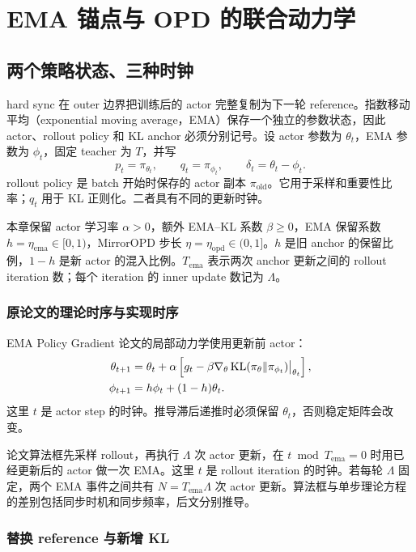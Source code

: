 \chapter{EMA 锚点与 OPD 的联合动力学}
\label{chap:ema}

\section{两个策略状态、三种时钟}

hard sync 在 outer 边界把训练后的 actor 完整复制为下一轮 reference。指数移动平均（exponential moving average，EMA）保存一个独立的参数状态，因此 actor、rollout policy 和 KL anchor 必须分别记号。设 actor 参数为 $\theta_t$，EMA 参数为 $\phi_t$，固定 teacher 为 $T$，并写
\[
 p_t=\pi_{\theta_t},\qquad q_t=\pi_{\phi_t},\qquad
 \delta_t=\theta_t-\phi_t.
\]
rollout policy 是 batch 开始时保存的 actor 副本 $\pi_{\mathrm{old}}$。它用于采样和重要性比率；$q_t$ 用于 KL 正则化。二者具有不同的更新时钟。

本章保留 actor 学习率 $\alpha>0$，额外 EMA--KL 系数 $\beta\ge0$，EMA 保留系数 $h=\eta_{\mathrm{ema}}\in[0,1)$，MirrorOPD 步长 $\eta=\eta_{\mathrm{opd}}\in(0,1]$。$h$ 是旧 anchor 的保留比例，$1-h$ 是新 actor 的混入比例。$T_{\mathrm{ema}}$ 表示两次 anchor 更新之间的 rollout iteration 数；每个 iteration 的 inner update 数记为 $\Lambda$。

\subsection{原论文的理论时序与实现时序}

EMA Policy Gradient 论文的局部动力学使用更新前 actor：\cite{ema2026}
\begin{align}
 \theta_{t+1}&=\theta_t+\alpha\left[g_t-
 \beta\nabla_\theta\operatorname{KL}(\pi_\theta\Vert\pi_{\phi_t})\big|_{\theta_t}\right],
 \label{eq:ema-pre-actor}\\
 \phi_{t+1}&=h\phi_t+(1-h)\theta_t.
 \label{eq:ema-pre-anchor}
\end{align}
这里 $t$ 是 actor step 的时钟。推导滞后递推时必须保留 $\theta_t$，否则稳定矩阵会改变。

论文算法框先采样 rollout，再执行 $\Lambda$ 次 actor 更新，在 $t\bmod T_{\mathrm{ema}}=0$ 时用已经更新后的 actor 做一次 EMA。这里 $t$ 是 rollout iteration 的时钟。若每轮 $\Lambda$ 固定，两个 EMA 事件之间共有 $N=T_{\mathrm{ema}}\Lambda$ 次 actor 更新。算法框与单步理论方程的差别包括同步时机和同步频率，后文分别推导。

\subsection{替换 reference 与新增 KL}

